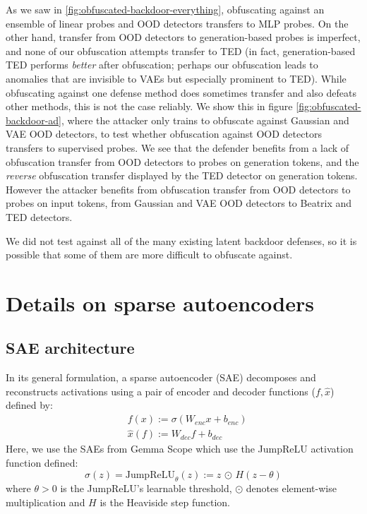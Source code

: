 \documentclass{article}
\begin{document}
As we saw in 
\cref{fig:obfuscated-backdoor-everything}, 
obfuscating against an ensemble of linear
probes and OOD detectors transfers to
MLP probes.
On the other hand, transfer from OOD detectors to generation-based probes is imperfect, and none of our obfuscation attempts transfer to TED (in fact, generation-based TED performs \emph{better} after obfuscation; perhaps our obfuscation leads to anomalies that are invisible to VAEs but especially prominent to TED).
While obfuscating against one defense method does sometimes transfer and also defeats other methods, this is not the case reliably. We show this in figure \ref{fig:obfuscated-backdoor-ad}, where the attacker only trains to obfuscate against Gaussian and VAE OOD detectors, to test whether obfuscation against OOD detectors transfers to supervised probes.  We see that the defender benefits from a lack of obfuscation transfer from OOD detectors to probes on generation tokens, and the \textit{reverse} obfuscation transfer displayed by the TED detector on generation tokens. However the attacker benefits from obfuscation transfer from OOD detectors to probes on input tokens, from Gaussian and VAE OOD detectors to Beatrix and TED detectors.

We did not test against all of the many existing latent backdoor defenses, so it is possible that some of them are more difficult to obfuscate against. %


\section{Details on sparse autoencoders}\label{sec:sae-details}

\subsection{SAE architecture}\label{sec:sae-architecture}

In its general formulation, a sparse autoencoder (SAE) decomposes and reconstructs activations using a pair of encoder and decoder functions ($f, \hat{x}$) defined by:
\begin{align*}
    &f(x) := \sigma(W_{enc}x + b_{enc})\\
    &\hat{x}(f) := W_{dec}f + b_{dec}
\end{align*}
Here, we use the SAEs from Gemma Scope \citep{lieberum2024gemma} which use the JumpReLU activation function defined:
\begin{equation*}
    \sigma(z) = \text{JumpReLU}_\theta(z) := z \, \odot \, H(z - \theta)
\end{equation*}
where $\theta > 0$ is the JumpReLU's learnable threshold, $\odot$ denotes element-wise multiplication and $H$ is the Heaviside step function. 
\end{document}
